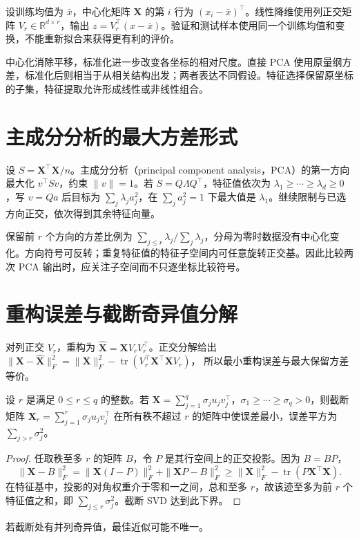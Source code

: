 \documentclass[UTF8,12pt,a4paper,fontset=fandol]{ctexbook}
\begin{document}
设训练均值为 $\bar x$，中心化矩阵 $\mathbf X$ 的第 $i$ 行为 $(x_i-\bar x)^\top$。线性降维使用列正交矩阵 $V_r\in\mathbb R^{d\times r}$，输出 $z=V_r^\top(x-\bar x)$。验证和测试样本使用同一个训练均值和变换，不能重新拟合来获得更有利的评价。

中心化消除平移，标准化进一步改变各坐标的相对尺度。直接 PCA 使用原量纲方差，标准化后则相当于从相关结构出发；两者表达不同假设。特征选择保留原坐标的子集，特征提取允许形成线性或非线性组合。

\section{主成分分析的最大方差形式}

设 $S=\mathbf X^\top\mathbf X/n$。主成分分析（principal component analysis，PCA）的第一方向最大化 $v^\top Sv$，约束 $\|v\|=1$。若 $S=Q\Lambda Q^\top$，特征值依次为 $\lambda_1\geq\cdots\geq\lambda_d\geq0$，写 $v=Qa$ 后目标为 $\sum_j\lambda_ja_j^2$，在 $\sum_ja_j^2=1$ 下最大值是 $\lambda_1$。继续限制与已选方向正交，依次得到其余特征向量。

保留前 $r$ 个方向的方差比例为 $\sum_{j\leq r}\lambda_j/\sum_j\lambda_j$，分母为零时数据没有中心化变化。方向符号可反转；重复特征值的特征子空间内可任意旋转正交基。因此比较两次 PCA 输出时，应关注子空间而不只逐坐标比较符号。

\section{重构误差与截断奇异值分解}

对列正交 $V_r$，重构为 $\widehat{\mathbf X}=\mathbf XV_rV_r^\top$。正交分解给出
$\|\mathbf X-\widehat{\mathbf X}\|_F^2=\|\mathbf X\|_F^2-\operatorname{tr}(V_r^\top\mathbf X^\top\mathbf XV_r)$，
所以最小重构误差与最大保留方差等价。

\begin{theorem}
设 $r$ 是满足 $0\leq r\leq q$ 的整数。若 $\mathbf X=\sum_{j=1}^{q}\sigma_ju_jv_j^\top$，$\sigma_1\geq\cdots\geq\sigma_q>0$，则截断矩阵 $\mathbf X_r=\sum_{j=1}^{r}\sigma_ju_jv_j^\top$ 在所有秩不超过 $r$ 的矩阵中使误差最小，误差平方为 $\sum_{j>r}\sigma_j^2$。
\end{theorem}
\begin{proof}
任取秩至多 $r$ 的矩阵 $B$，令 $P$ 是其行空间上的正交投影。因为 $B=BP$，
\[
 \|\mathbf X-B\|_F^2
 =\|\mathbf X(I-P)\|_F^2+\|\mathbf XP-B\|_F^2
 \geq\|\mathbf X\|_F^2-\operatorname{tr}(P\mathbf X^\top\mathbf X).
\]
在特征基中，投影的对角权重介于零和一之间，总和至多 $r$，故该迹至多为前 $r$ 个特征值之和，即 $\sum_{j\leq r}\sigma_j^2$。截断 SVD 达到此下界。
\end{proof}
若截断处有并列奇异值，最佳近似可能不唯一。
\end{document}
